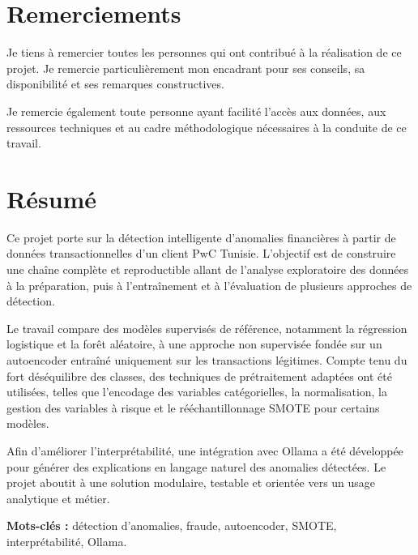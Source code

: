 \documentclass[12pt,a4paper,twoside]{report}
\begin{document}
\chapter*{Remerciements}

Je tiens à remercier toutes les personnes qui ont contribué à la réalisation de ce projet. Je remercie particulièrement mon encadrant pour ses conseils, sa disponibilité et ses remarques constructives.

Je remercie également toute personne ayant facilité l'accès aux données, aux ressources techniques et au cadre méthodologique nécessaires à la conduite de ce travail.

\newpage

\chapter*{Résumé}

Ce projet porte sur la détection intelligente d'anomalies financières à partir de données transactionnelles d'un client PwC Tunisie. L'objectif est de construire une chaîne complète et reproductible allant de l'analyse exploratoire des données à la préparation, puis à l'entraînement et à l'évaluation de plusieurs approches de détection.

Le travail compare des modèles supervisés de référence, notamment la régression logistique et la forêt aléatoire, à une approche non supervisée fondée sur un autoencoder entraîné uniquement sur les transactions légitimes. Compte tenu du fort déséquilibre des classes, des techniques de prétraitement adaptées ont été utilisées, telles que l'encodage des variables catégorielles, la normalisation, la gestion des variables à risque et le rééchantillonnage SMOTE pour certains modèles.

Afin d'améliorer l'interprétabilité, une intégration avec Ollama a été développée pour générer des explications en langage naturel des anomalies détectées. Le projet aboutit à une solution modulaire, testable et orientée vers un usage analytique et métier.

\textbf{Mots-clés :} détection d'anomalies, fraude, autoencoder, SMOTE, interprétabilité, Ollama.

\newpage

\end{document}
